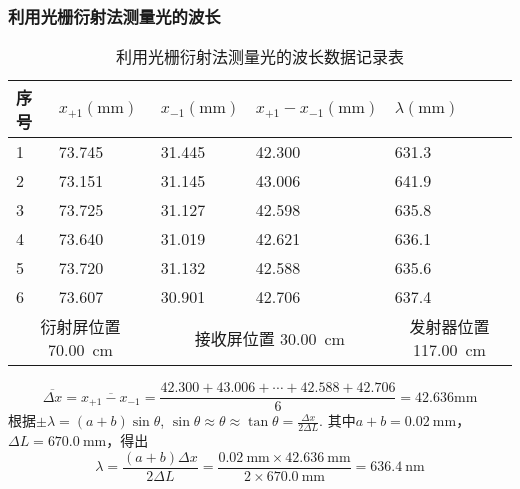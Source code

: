 \documentclass[]{../template/Report}%
\begin{document}
\begin{fullreportonly}
\subsubsection{利用光栅衍射法测量光的波长}
\begin{table}[H]
\centering
\caption{利用光栅衍射法测量光的波长数据记录表}
\label{tab:lambda}
\begin{tabular}{|ll|ll|l|}
\hline
\multicolumn{1}{|l|}{序号} & $x_{+1}(\si{\mm})$ & \multicolumn{1}{l|}{$x_{-1}(\si{\mm})$} & $x_{+1} - x_{-1}(\si{\mm})$ & $\lambda(\si{\mm})$                        \\ \hline
\multicolumn{1}{|l|}{1} & 73.745 & \multicolumn{1}{l|}{31.445} & 42.300 & 631.3 \\ \hline
\multicolumn{1}{|l|}{2} & 73.151 & \multicolumn{1}{l|}{31.145} & 43.006 & 641.9 \\ \hline
\multicolumn{1}{|l|}{3} & 73.725 & \multicolumn{1}{l|}{31.127} & 42.598 & 635.8 \\ \hline
\multicolumn{1}{|l|}{4} & 73.640 & \multicolumn{1}{l|}{31.019} & 42.621 & 636.1 \\ \hline
\multicolumn{1}{|l|}{5} & 73.720 & \multicolumn{1}{l|}{31.132} & 42.588 & 635.6 \\ \hline
\multicolumn{1}{|l|}{6} & 73.607 & \multicolumn{1}{l|}{30.901} & 42.706 & 637.4 \\ \hline
\multicolumn{2}{|c|}{衍射屏位置 \SI{70.00}{\cm}}   & \multicolumn{2}{c|}{接收屏位置 \SI{30.00}{\cm}}                            & \multicolumn{1}{c|}{发射器位置\SI{117.00}{\cm}} \\ \hline
\end{tabular}%
\end{table}
\[
\overline{\Delta x} = \overline{x_{+1} - x_{-1}} = \frac{42.300 + 43.006 + \cdots + 42.588 + 42.706}{6} = 42.636 \si{\mm}
\]
根据$\pm \lambda = (a + b)\sin \theta$, $\sin \theta \approx \theta \approx \tan \theta = \frac{\Delta x}{2\Delta L}$. 其中$a + b = \SI{0.02}{\mm}$，$\Delta L = \SI{670.0}{\mm}$，得出
\[
\lambda = \frac{(a + b)\Delta x}{2\Delta L} = \frac{\SI{0.02}{\mm} \times \SI{42.636}{\mm}}{2 \times \SI{670.0}{\mm}} = \SI{636.4}{\nm}
\]

\end{fullreportonly}
\end{document}
